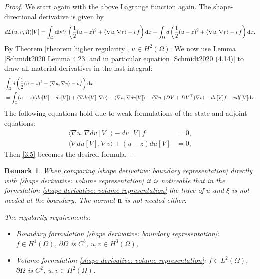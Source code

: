 \documentclass[oneside,11pt]{book}
\numberwithin{equation}{section}
\newtheorem{remark}{Remark}[section]
\begin{document}
\begin{proof}
    We start again with the above Lagrange function again. The shape-directional derivative is given by
    \begin{align}
        \label{3.5}
        d\mathcal{L}(u,v,\Omega)[V] = \int_\Omega {\rm div} V\left(\frac{1}{2}(u - z)^2 + \langle\nabla u,\nabla v\rangle - vf\right){\rm d}x + \int_\Omega d\left(\frac{1}{2}(u - z)^2 + \langle\nabla u,\nabla v\rangle - vf\right){\rm d}x.
    \end{align}
    By Theorem \ref{theorem higher regularity}, $u\in H^2(\Omega)$. We now use Lemma \ref{Schmidt2020 Lemma 4.23} and in particular equation \eqref{Schmidt2020 (4.14)} to draw all material derivatives in the last integral:
    \begin{align}
        &\int_\Omega d\left(\frac{1}{2}(u - z)^2 + \langle\nabla u,\nabla v\rangle - vf\right){\rm d}x \nonumber\\
        &= \int_\Omega (u - z)(du[V] - dz[V]) + \langle\nabla du[V],\nabla v\rangle + \langle\nabla u,\nabla dv[V]\rangle - \langle\nabla u,(DV + DV^\top)\nabla v\rangle - dv[V]f - v df[V]{\rm d}x.\label{Schmidt2020 (4.26)}
    \end{align}
    The following equations hold due to weak formulations of the state and adjoint equations:
    \begin{align}
        \langle\nabla u,\nabla dv[V]\rangle - dv[V]f &= 0,\\
        \langle\nabla du[V],\nabla v\rangle + (u - z)du[V] &= 0,
    \end{align}
    Then \eqref{3.5} becomes the desired formula.
\end{proof}

\begin{remark}
    When comparing \eqref{shape derivative: boundary representation} directly with \eqref{shape derivative: volume representation} it is noticeable that in the formulation \eqref{shape derivative: volume representation} the trace of $u$ and $\xi$ is not needed at the boundary. The normal ${\bf n}$ is not needed either.
    
    The regularity requirements:
    \begin{itemize}
        \item[(i)] Boundary formulation \eqref{shape derivative: boundary representation}: $f\in H^1(\Omega)$, $\partial\Omega$ is $C^3$, $u,v\in H^3(\Omega)$,
        \item[(ii)] Volume formulation \eqref{shape derivative: volume representation}: $f\in L^2(\Omega)$, $\partial\Omega$ is $C^2$, $u,v\in H^2(\Omega)$.
    \end{itemize}
\end{remark}
\end{document}

